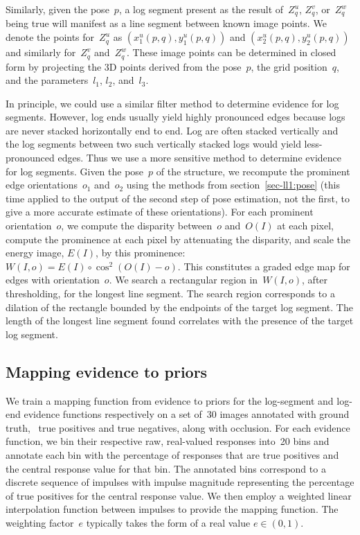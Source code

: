 Similarly, given the pose~$p$, a log segment present as the result of~$Z^u_q$,
$Z^v_q$, or~$Z^w_q$ being true will manifest as a line segment between known
image points.
%
We denote the points for~$Z^u_q$ as $(x^u_1(p,q),y^u_1(p,q))$ and
$(x^u_2(p,q),y^u_2(p,q))$ and similarly for~$Z^v_q$ and~$Z^w_q$.
%
These image points can be determined in closed form by projecting the 3D points
derived from the pose~$p$, the grid position~$q$, and the
parameters~$l_1$, $l_2$, and~$l_3$.

In principle, we could use a similar filter method to determine evidence for
log segments.
%
However, log ends usually yield highly pronounced edges because logs are never
stacked horizontally end to end.
%
Log are often stacked vertically and the log segments between two such
vertically stacked logs would yield less-pronounced edges.
%
Thus we use a more sensitive method to determine evidence for log segments.
%
Given the pose~$p$ of the structure, we recompute the prominent edge
orientations~$o_1$ and~$o_2$ using the methods from section~\ref{sec-ll1:pose}
(this time applied to the output of the second step of pose estimation, not the
first, to give a more accurate estimate of these orientations).
%
For each prominent orientation~$o$, we compute the disparity between~$o$
and~$O(I)$ at each pixel, compute the prominence at each pixel by attenuating
the disparity, and scale the energy image, $E(I)$, by this prominence:
%
$W(I,o)=E(I)\circ\cos^2(O(I)-o)$.
%
This constitutes a graded edge map for edges with orientation~$o$.
%
%
We search a rectangular region in~$W(I,o)$, after thresholding, for the longest
line segment.
%
%
The search region corresponds to a dilation of the rectangle bounded by the
endpoints of the target log segment.
%
The length of the longest line segment found correlates with the presence of the
target log segment.

\subsection{Mapping evidence to priors}
\label{sec-ll1:mapping}
%
We train a mapping function from evidence to priors for the log-segment and
log-end evidence functions respectively on a set of~30 images annotated with
ground truth, \ie\ true positives and true negatives, along with occlusion.
%
For each evidence function, we bin their respective raw, real-valued responses
into~20 bins and annotate each bin with the percentage of responses that are
true positives and the central response value for that bin.
%
The annotated bins correspond to a discrete sequence of impulses with impulse
magnitude representing the percentage of true positives for the central response
value.
%
We then employ a weighted linear interpolation function between impulses to
provide the mapping function.
%
The weighting factor~$e$ typically takes the form of a real value $e\in(0,1)$.

